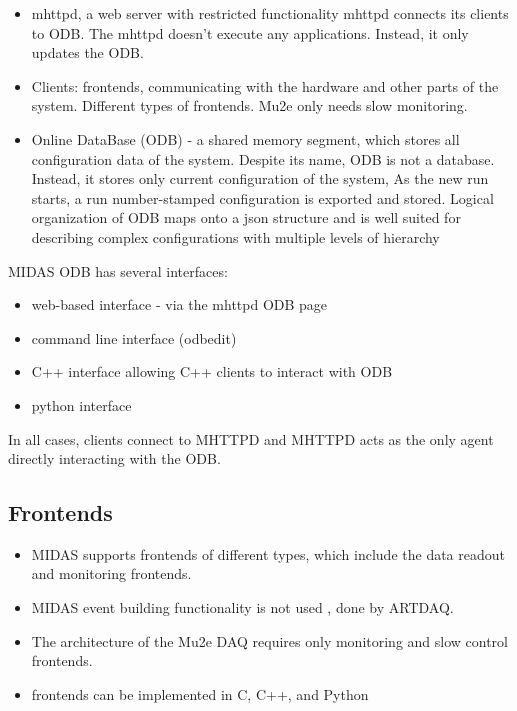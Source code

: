 \begin{itemize}
\item 
  mhttpd, a web server with restricted functionality
  mhttpd connects its clients to ODB. 
  The mhttpd doesn't execute any applications. Instead, it only updates the ODB.
\item
  Clients: frontends, communicating with the hardware and other
  parts of the system. Different types of frontends. Mu2e only needs slow monitoring.
\item
  Online DataBase (ODB) - a shared memory segment, which stores all configuration data of the system. Despite its name, ODB is not a database. Instead, it stores only current configuration
  of the system, As the new run starts, a run number-stamped configuration is exported and stored.
  Logical organization of ODB maps onto a json structure and is well suited for describing
  complex configurations with multiple levels of hierarchy
\end{itemize}

MIDAS ODB has several interfaces:
\begin{itemize}
\item 
  web-based interface - via the mhttpd ODB page
\item
  command line interface (odbedit)
\item
  C++ interface allowing C++ clients to interact with ODB
\item
  python interface
\end{itemize}

In all cases, clients connect to MHTTPD and MHTTPD acts as
the only agent directly interacting with the ODB.

\subsection{Frontends}

\begin{itemize}
\item 
  MIDAS supports frontends of different types, which include the data readout and monitoring
  frontends.
\item 
  MIDAS event building functionality is not used , done by ARTDAQ.
\item 
  The architecture of the Mu2e DAQ requires only monitoring and slow control frontends.
\item
  frontends can be implemented in C, C++, and Python
\end{itemize}


